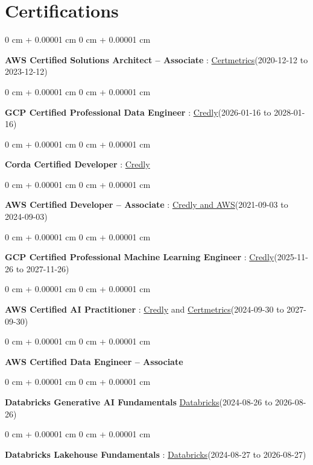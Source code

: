 \documentclass[10pt, letterpaper]{article}
\newenvironment{onecolentry}{
    \begin{adjustwidth}{
        0 cm + 0.00001 cm
    }{
        0 cm + 0.00001 cm
    }
}{
    \end{adjustwidth}
} %
\begin{document}
    \vspace{2 pt }
    \section{Certifications}
        \vspace{2 pt }
        \begin{samepage}
            \begin{onecolentry}
                \textbf{AWS Certified Solutions Architect – Associate} : \href{https://cp.certmetrics.com/amazon/en/public/verify/credential/SNBY48EBJJVE1SWX}{Certmetrics}(2020-12-12 to 2023-12-12)
            \end{onecolentry}
            \begin{onecolentry}
                \textbf{GCP Certified Professional Data Engineer} : \href{https://www.credly.com/badges/977e96d9-12e7-4f6c-b8a7-df71fb7153b8/public_url}{Credly}(2026-01-16 to 2028-01-16)
            \end{onecolentry}
            \begin{onecolentry}
                \textbf{Corda Certified Developer} : \href{https://www.credly.com/badges/7f29d39c-34b6-4de9-b07d-e10f1090a335/linked_in_profile}{Credly}
            \end{onecolentry}
            \begin{onecolentry}
                \textbf{AWS Certified Developer – Associate} : \href{https://www.credly.com/badges/b8106fbd-d3d1-4204-8cdf-e708798fd582/public_url}{Credly and AWS}(2021-09-03  to 2024-09-03)
            \end{onecolentry}
            \begin{onecolentry}
                \textbf{GCP Certified Professional Machine Learning Engineer} : \href{https://www.credly.com/badges/a6965347-09ea-4d8f-b398-0e151407160d/public_url}{Credly}(2025-11-26 to 2027-11-26)
            \end{onecolentry}
            \begin{onecolentry}
                \textbf{AWS Certified AI Practitioner} : \href{https://www.credly.com/badges/451b7ba5-8be1-4a8e-bbec-ade26627a6b6/public_url}{Credly} and \href{https://cp.certmetrics.com/amazon/en/public/verify/credential/495f0d9853874bf9a33c17f8e89ce131}{Certmetrics}(2024-09-30 to 2027-09-30)
            \end{onecolentry}
            \begin{onecolentry}
                \textbf{AWS Certified Data Engineer – Associate}
            \end{onecolentry}
            \begin{onecolentry}
                \textbf{Databricks Generative AI Fundamentals} \href{https://sgq.io/3uIFGNi}{Databricks}(2024-08-26 to 2026-08-26)
            \end{onecolentry}
            \begin{onecolentry}
                \textbf{Databricks Lakehouse Fundamentals} : \href{https://scl.io/FXGKS0u}{Databricks}(2024-08-27 to 2026-08-27)
            \end{onecolentry}
        \end{samepage}
\end{document}

